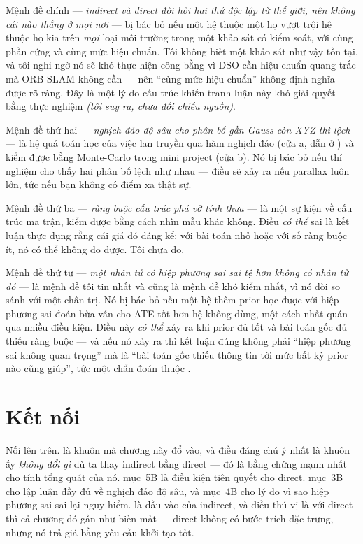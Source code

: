 \documentclass[../../vslam.tex]{subfiles}
\begin{document}
Mệnh đề chính --- \emph{indirect và direct đòi hỏi hai thứ độc lập từ thế giới, nên không cái nào thắng ở mọi nơi} --- bị bác bỏ nếu một hệ thuộc một họ vượt trội hệ thuộc họ kia trên \emph{mọi} loại môi trường trong một khảo sát có kiểm soát, với cùng phần cứng và cùng mức hiệu chuẩn. Tôi không biết một khảo sát như vậy tồn tại, và tôi nghi ngờ nó sẽ khó thực hiện công bằng vì DSO cần hiệu chuẩn quang trắc mà ORB-SLAM không cần --- nên ``cùng mức hiệu chuẩn'' không định nghĩa được rõ ràng. Đây là một lý do cấu trúc khiến tranh luận này khó giải quyết bằng thực nghiệm \emph{(tôi suy ra, chưa đối chiếu nguồn)}.

Mệnh đề thứ hai --- \emph{nghịch đảo độ sâu cho phân bố gần Gauss còn XYZ thì lệch} --- là hệ quả toán học của việc lan truyền qua hàm nghịch đảo (cửa a, dẫn ở ) và kiểm được bằng Monte-Carlo trong mini project (cửa b). Nó bị bác bỏ nếu thí nghiệm cho thấy hai phân bố lệch như nhau --- điều sẽ xảy ra nếu parallax luôn lớn, tức nếu bạn không có điểm xa thật sự.

Mệnh đề thứ ba --- \emph{ràng buộc cấu trúc phá vỡ tính thưa} --- là một sự kiện về cấu trúc ma trận, kiểm được bằng cách nhìn mẫu khác không. Điều \emph{có thể} sai là kết luận thực dụng rằng cái giá đó đáng kể: với bài toán nhỏ hoặc với số ràng buộc ít, nó có thể không đo được. Tôi chưa đo.

Mệnh đề thứ tư --- \emph{một nhân tử có hiệp phương sai sai tệ hơn không có nhân tử đó} --- là mệnh đề tôi tin nhất và cũng là mệnh đề khó kiểm nhất, vì nó đòi so sánh với một chân trị. Nó bị bác bỏ nếu một hệ thêm prior học được với hiệp phương sai đoán bừa vẫn cho ATE tốt hơn hệ không dùng, một cách nhất quán qua nhiều điều kiện. Điều này \emph{có thể} xảy ra khi prior đủ tốt và bài toán gốc đủ thiếu ràng buộc --- và nếu nó xảy ra thì kết luận đúng không phải ``hiệp phương sai không quan trọng'' mà là ``bài toán gốc thiếu thông tin tới mức bất kỳ prior nào cũng giúp'', tức một chẩn đoán thuộc .

\section{Kết nối}

Nối lên trên.  là khuôn mà chương này đổ vào, và điều đáng chú ý nhất là khuôn ấy \emph{không đổi gì} dù ta thay indirect bằng direct --- đó là bằng chứng mạnh nhất cho tính tổng quát của nó.  mục~5B là điều kiện tiên quyết cho direct.  mục~3B cho lập luận đầy đủ về nghịch đảo độ sâu, và mục~4B cho lý do vì sao hiệp phương sai sai lại nguy hiểm.  là đầu vào của indirect, và điều thú vị là với direct thì cả chương đó gần như biến mất --- direct không có bước trích đặc trưng, nhưng nó trả giá bằng yêu cầu khởi tạo tốt.
\end{document}
